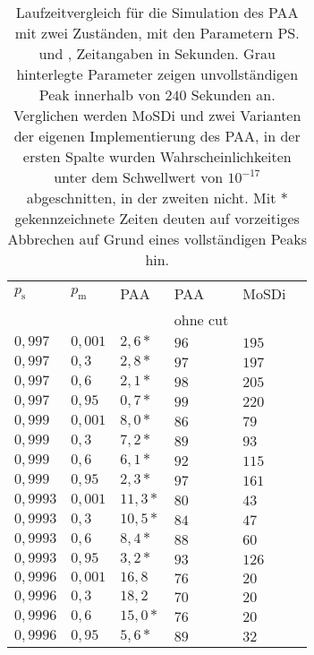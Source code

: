 \begin{table}[h]
\centering
\caption[Laufzeitvergleich für die Simulation des PAA mit zwei Zuständen]{Laufzeitvergleich für die Simulation des PAA mit zwei Zuständen, mit den Parametern \ps und \pm, Zeitangaben in Sekunden. Grau hinterlegte Parameter zeigen unvollständigen Peak innerhalb von $240$ Sekunden an. Verglichen werden MoSDi und zwei Varianten der eigenen Implementierung des PAA, in der ersten Spalte wurden Wahrscheinlichkeiten unter dem Schwellwert von $10^{-17}$ abgeschnitten, in der zweiten nicht. Mit $*$ gekennzeichnete Zeiten deuten auf vorzeitiges Abbrechen auf Grund eines vollständigen Peaks hin.}
\label{2s_laufzeit_paa}
\begin{tabular}{|l|l||l|l|l|l|} \hline
$p_\text{s}$ & $p_\text{m}$  & PAA & PAA & MoSDi \\
& & & ohne cut & \\  \hline \hline
$0,997  $ & $ 0,001$ & $2,6*  $ & $96 $ & $ 195$ \\ \hline
$0,997  $ & $ 0,3  $ & $2,8*  $ & $97 $ & $ 197 $ \\ \hline
$0,997  $ & $ 0,6  $ & $2,1*  $ & $98 $ & $ 205 $ \\ \hline
$0,997  $ & $ 0,95 $ & $0,7*  $ & $99 $ & $ 220$ \\ \hline
$0,999  $ & $ 0,001$ & $8,0*  $ & $86 $ & $ 79$ \\ \hline
$0,999  $ & $ 0,3  $ & $7,2*  $ & $89 $ & $ 93$ \\ \hline
$0,999  $ & $ 0,6  $ & $6,1*  $ & $92 $ & $ 115$ \\ \hline
$0,999  $ & $ 0,95 $ & $2,3*  $ & $97 $ & $ 161$ \\ \hline
$0,9993 $ & $ 0,001$ & $11,3* $ & $80 $ & $ 43$ \\ \hline
$0,9993 $ & $ 0,3  $ & $10,5* $ & $84 $ & $ 47$ \\ \hline
$0,9993 $ & $ 0,6  $ & $8,4*  $ & $88 $ & $ 60$ \\ \hline
$0,9993 $ & $ 0,95 $ & $3,2*  $ & $93 $ & $ 126$ \\ \hline
\cellcolor{gray!40}$0,9996 $ &\cellcolor{gray!40}$ 0,001$ & $16,8 $ & $76 $ & $ 20$ \\ \hline
$0,9996 $ & $ 0,3  $ & $18,2 $ & $70 $ & $ 20$ \\ \hline
$0,9996 $ & $ 0,6  $ & $15,0* $ & $76 $ & $ 20$ \\ \hline
$0,9996 $ & $ 0,95 $ & $5,6*  $ & $89 $ & $ 32$ \\ \hline
\end{tabular}
\end{table}


